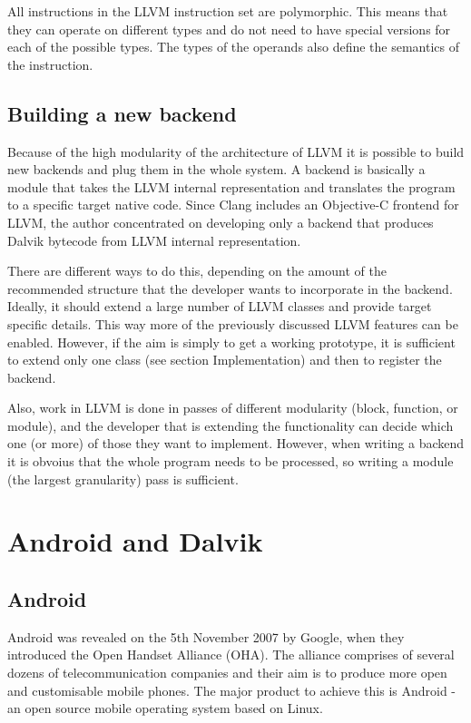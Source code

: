 \documentclass[parskip]{cs4rep}
\begin{document}
All instructions in the LLVM instruction set are polymorphic. This means that they can operate on different types and do not need to have special versions for each of the possible types. The types of the operands also define the semantics of the instruction.

\subsection{Building a new backend}

Because of the high modularity of the architecture of LLVM it is possible to build new backends and plug them in the whole system. A backend is basically a module that takes the LLVM internal representation and translates the program to a specific target native code. Since Clang includes an Objective-C frontend for LLVM, the author concentrated on developing only a backend that produces Dalvik bytecode from LLVM internal representation.

There are different ways to do this, depending on the amount of the recommended structure that the developer wants to incorporate in the backend. Ideally, it should extend a large number of LLVM classes and provide target specific details\cite{P8}. This way more of the previously discussed LLVM features can be enabled. However, if the aim is simply to get a working prototype, it is sufficient to extend only one class (see section Implementation) and then to register the backend.

Also, work in LLVM is done in passes of different modularity (block, function, or module), and the developer that is extending the functionality can decide which one (or more) of those they want to implement. However, when writing a backend it is obvoius that the whole program needs to be processed, so writing a module (the largest granularity) pass is sufficient.

\section{Android and Dalvik}

\subsection{Android}

Android was revealed on the 5th November 2007 by Google, when they introduced the Open Handset Alliance (OHA)\cite{DeLacey2007}. The alliance comprises of several dozens of telecommunication companies and their aim is to produce more open and customisable mobile phones. The major product to achieve this is Android - an open source mobile operating system based on Linux.
\end{document}
